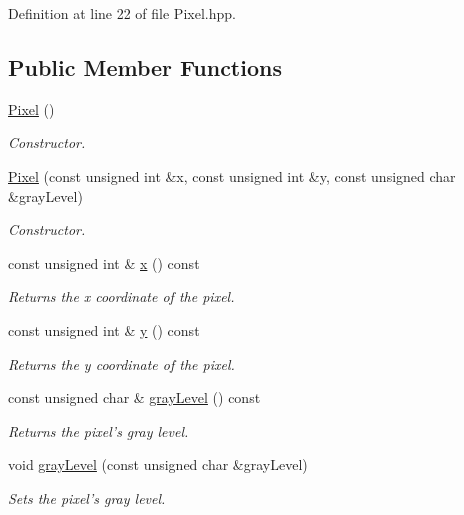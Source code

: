 Definition at line 22 of file Pixel.hpp.\subsection*{Public Member Functions}
\begin{CompactItemize}
\item 
\hyperlink{class_pixel_27ad99a2f705e635c42d242d530d4756}{Pixel} ()
\begin{CompactList}\small\item\em Constructor. \item\end{CompactList}\item 
\hyperlink{class_pixel_31103b6b7b52712789d1fdab7ab7ce29}{Pixel} (const unsigned int \&x, const unsigned int \&y, const unsigned char \&grayLevel)
\begin{CompactList}\small\item\em Constructor. \item\end{CompactList}\item 
const unsigned int \& \hyperlink{class_pixel_526b7e40e1d376dcf0a48dc909d23221}{x} () const 
\begin{CompactList}\small\item\em Returns the x coordinate of the pixel. \item\end{CompactList}\item 
const unsigned int \& \hyperlink{class_pixel_9ed8db7cb358be3bf3409a0a31963e9d}{y} () const 
\begin{CompactList}\small\item\em Returns the y coordinate of the pixel. \item\end{CompactList}\item 
const unsigned char \& \hyperlink{class_pixel_f27beae979bf0fab21987996d4a2d110}{grayLevel} () const 
\begin{CompactList}\small\item\em Returns the pixel's gray level. \item\end{CompactList}\item 
void \hyperlink{class_pixel_d00a337e0d9765daafe3017f2d819df8}{grayLevel} (const unsigned char \&grayLevel)
\begin{CompactList}\small\item\em Sets the pixel's gray level. \item\end{CompactList}\end{CompactItemize}
